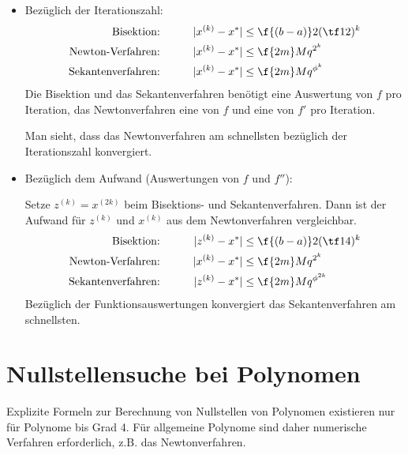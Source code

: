 \documentclass[11pt]{scrbook}
\begin{document}
\begin{nt*}
	\begin{itemize}
		\item
			Bezüglich der Iterationszahl:
			\begin{alignat*}{3}
				\text{Bisektion:}&\qquad& |x^{(k)} -x^*| &\le \f {(b-a)}2 (\tf 12)^k \\
				\text{Newton-Verfahren:}&\qquad& |x^{(k)} -x^*| &\le \f {2m}M q^{2^k} \\
				\text{Sekantenverfahren:}&\qquad& |x^{(k)} -x^*| &\le \f {2m}M q^{\phi^k}
			\end{alignat*}
			Die Bisektion und das Sekantenverfahren benötigt eine Auswertung von $f$ pro Iteration, das Newtonverfahren eine von $f$ und eine von $f'$ pro Iteration.

			Man sieht, dass das Newtonverfahren am schnellsten bezüglich der Iterationszahl konvergiert.
		\item
			Bezüglich dem Aufwand (Auswertungen von $f$ und $f''$):

			Setze $z^{(k)} = x^{(2k)}$ beim Bisektions- und Sekantenverfahren.
			Dann ist der Aufwand für $z^{(k)}$ und $x^{(k)}$ aus dem Newtonverfahren vergleichbar.
			\begin{alignat*}{3}
				\text{Bisektion:}&\qquad& |z^{(k)} -x^*| &\le \f {(b-a)}2 (\tf 14)^k \\
				\text{Newton-Verfahren:}&\qquad& |x^{(k)} -x^*| &\le \f {2m}M q^{2^k} \\
				\text{Sekantenverfahren:}&\qquad& |z^{(k)} -x^*| &\le \f {2m}M q^{\phi^{2k}} 
			\end{alignat*}
			Bezüglich der Funktionsauswertungen konvergiert das Sekantenverfahren am schnellsten.


	\end{itemize}
\end{nt*}

\section{Nullstellensuche bei Polynomen}

Explizite Formeln zur Berechnung von Nullstellen von Polynomen existieren nur für Polynome bis Grad 4.
Für allgemeine Polynome sind daher numerische Verfahren erforderlich, z.B. das Newtonverfahren.
\end{document}

